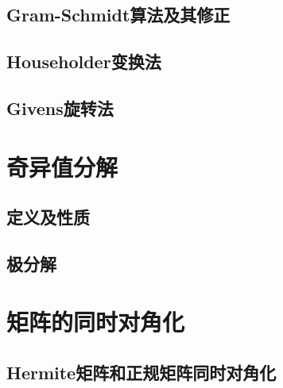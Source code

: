 \begin{definition}
\end{definition}

\subsection{Gram-Schmidt算法及其修正}
\label{sub:Gram-Schmidt算法及其修正}

\subsection{Householder变换法}
\label{sub:Householder变换法}

\begin{definition}
\end{definition}

\subsection{Givens旋转法}
\label{sub:Givens旋转法}

\begin{definition}
\end{definition}

\section{奇异值分解}
\label{sec:奇异值分解}

\subsection{定义及性质}
\label{sub:定义及性质}

\begin{definition}
\end{definition}

\subsection{极分解}
\label{sub:极分解}

\section{矩阵的同时对角化}
\label{sec:矩阵的同时对角化}

\subsection{Hermite矩阵和正规矩阵同时对角化}
\label{sub:Hermite矩阵和正规矩阵同时对角化}

